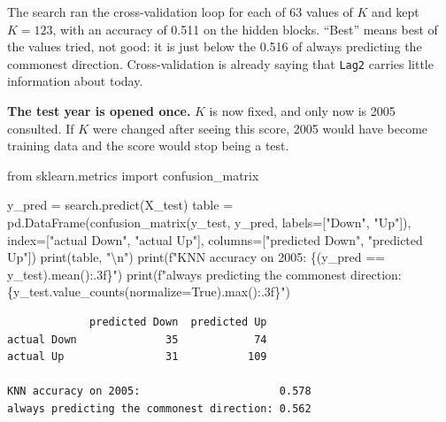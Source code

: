 \documentclass[
  letterpaper,
  10pt,
  twoside,
  openright,
  numbers=noenddot,
  chapterprefix=true]{scrbook}
\newenvironment{Shaded}{}{}
\newcommand{\BuiltInTok}[1]{\textcolor[rgb]{0.84,0.23,0.29}{#1}}
\newcommand{\CharTok}[1]{\textcolor[rgb]{0.01,0.18,0.38}{#1}}
\newcommand{\ImportTok}[1]{\textcolor[rgb]{0.01,0.18,0.38}{#1}}
\newcommand{\NormalTok}[1]{\textcolor[rgb]{0.14,0.16,0.18}{#1}}
\newcommand{\OperatorTok}[1]{\textcolor[rgb]{0.14,0.16,0.18}{#1}}
\newcommand{\SpecialCharTok}[1]{\textcolor[rgb]{0.00,0.36,0.77}{#1}}
\newcommand{\SpecialStringTok}[1]{\textcolor[rgb]{0.01,0.18,0.38}{#1}}
\newcommand{\StringTok}[1]{\textcolor[rgb]{0.01,0.18,0.38}{#1}}
\newcommand{\VariableTok}[1]{\textcolor[rgb]{0.89,0.38,0.04}{#1}}
\begin{document}
The search ran the cross-validation loop for each of 63 values of \(K\)
and kept \(K = 123\), with an accuracy of 0.511 on the hidden blocks.
``Best'' means best of the values tried, not good: it is just below the
0.516 of always predicting the commonest direction. Cross-validation is
already saying that \texttt{Lag2} carries little information about
today.

\textbf{The test year is opened once.} \(K\) is now fixed, and only now
is 2005 consulted. If \(K\) were changed after seeing this score, 2005
would have become training data and the score would stop being a test.

\label{check-smarket-test}
\begin{Shaded}
\begin{Highlighting}[]
\ImportTok{from}\NormalTok{ sklearn.metrics }\ImportTok{import}\NormalTok{ confusion\_matrix}

\NormalTok{y\_pred }\OperatorTok{=}\NormalTok{ search.predict(X\_test)}
\NormalTok{table }\OperatorTok{=}\NormalTok{ pd.DataFrame(confusion\_matrix(y\_test, y\_pred, labels}\OperatorTok{=}\NormalTok{[}\StringTok{"Down"}\NormalTok{, }\StringTok{"Up"}\NormalTok{]),}
\NormalTok{                     index}\OperatorTok{=}\NormalTok{[}\StringTok{"actual Down"}\NormalTok{, }\StringTok{"actual Up"}\NormalTok{],}
\NormalTok{                     columns}\OperatorTok{=}\NormalTok{[}\StringTok{"predicted Down"}\NormalTok{, }\StringTok{"predicted Up"}\NormalTok{])}
\BuiltInTok{print}\NormalTok{(table, }\StringTok{"}\CharTok{\textbackslash{}n}\StringTok{"}\NormalTok{)}
\BuiltInTok{print}\NormalTok{(}\SpecialStringTok{f"KNN accuracy on 2005:                      }\SpecialCharTok{\{}\NormalTok{(y\_pred }\OperatorTok{==}\NormalTok{ y\_test)}\SpecialCharTok{.}\NormalTok{mean()}\SpecialCharTok{:.3f\}}\SpecialStringTok{"}\NormalTok{)}
\BuiltInTok{print}\NormalTok{(}\SpecialStringTok{f"always predicting the commonest direction: }\SpecialCharTok{\{}\NormalTok{y\_test}\SpecialCharTok{.}\NormalTok{value\_counts(normalize}\OperatorTok{=}\VariableTok{True}\NormalTok{)}\SpecialCharTok{.}\BuiltInTok{max}\NormalTok{()}\SpecialCharTok{:.3f\}}\SpecialStringTok{"}\NormalTok{)}
\end{Highlighting}
\end{Shaded}

\begin{verbatim}
             predicted Down  predicted Up
actual Down              35            74
actual Up                31           109 

KNN accuracy on 2005:                      0.578
always predicting the commonest direction: 0.562
\end{verbatim}
\end{document}
